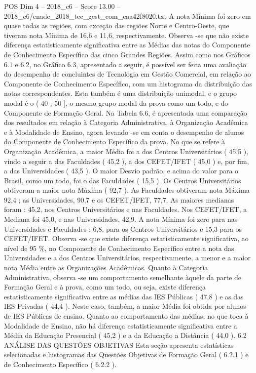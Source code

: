 \begin{textsample}{POS Dim 4 – 2018\_c6 – Score 13.00 – 2018\_c6/enade\_2018\_tec\_gest\_com\_caa42f8020.txt}
A nota Mínima foi zero em quase todas as regiões, com exceção das regiões Norte e Centro-Oeste, que tiveram nota Mínima de 16,6 e 11,6, respectivamente.
Observa -se que não existe diferença estatisticamente significativa entre as Médias das notas do Componente de Conhecimento Específico das cinco Grandes Regiões.
Assim como nos Gráficos 6.1 e 6.2, no Gráfico 6.3, apresentado a seguir, é possível ser feita uma avaliação do desempenho de concluintes de Tecnologia em Gestão Comercial, em relação ao Componente de Conhecimento Específico, com um histograma da distribuição das notas correspondentes.
Esta também é uma distribuição unimodal, e o grupo modal é o ( 40 ; 50 ], o mesmo grupo modal da prova como um todo, e do Componente de Formação Geral.
Na Tabela 6.6, é apresentada uma comparação dos resultados em relação à Categoria Administrativa, à Organização Acadêmica e à Modalidade de Ensino, agora levando -se em conta o desempenho de alunos do Componente de Conhecimento Específico da prova.
No que se refere à Organização Acadêmica, a maior Média foi a dos Centros Universitários ( 45,5 ), vindo a seguir a das Faculdades ( 45,2 ), a dos CEFET/IFET ( 45,0 ) e, por fim, a das Universidades ( 43,5 ).
O maior Desvio padrão, e acima do valor para o Brasil, como um todo, foi o das Faculdades ( 15,5 ).
Os Centros Universitários obtiveram a maior nota Máxima ( 92,7 ).
As Faculdades obtiveram nota Máxima 92,4 ; as Universidades, 90,7 e os CEFET/IFET, 77,7.
As maiores medianas foram : 45,2, nos Centros Universitários e nas Faculdades.
Nos CEFET/IFET, a Mediana foi 45,0, e nas Universidades, 42,9.
A nota Mínima foi zero para nas Universidades e Faculdades ; 6,8, para os Centros Universitários e 15,3 para os CEFET/IFET.
Observa -se que existe diferença estatisticamente significativa, ao nível de 95 \%, no Componente de Conhecimento Específico entre a nota das Universidades e a dos Centros Universitários, respectivamente, a menor e a maior nota Média entre as Organizações Acadêmicas.
Quanto à Categoria Administrativa, observa -se um comportamento semelhante àquele da parte de Formação Geral e à prova, como um todo, ou seja, existe diferença estatisticamente significativa entre as médias das IES Públicas ( 47,8 ) e as das IES Privadas ( 44,4 ).
Neste caso, também, a maior Média foi obtida por alunos de IES Públicas de ensino.
Quanto ao comportamento das médias, no que toca à Modalidade de Ensino, não há diferença estatisticamente significativa entre a Média da Educação Presencial ( 45,2 ) e a da Educação a Distância ( 44,0 ). 6.2 ANÁLISE DAS QUESTÕES OBJETIVAS Esta seção apresenta estatísticas selecionadas e histogramas das Questões Objetivas de Formação Geral ( 6.2.1 ) e de Conhecimento Específico ( 6.2.2 ).

\end{textsample}
